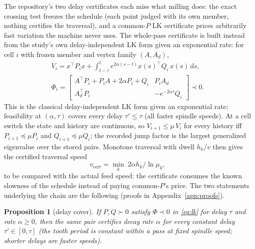 \documentclass[preprint,12pt]{elsarticle}
\newtheorem{proposition}{Proposition}
\newcommand{\vcert}{v_{\mathrm{cert}}}
\begin{document}
The repository's two delay certificates each miss what milling does:
the exact crossing test freezes the schedule (each point judged with
its own member, nothing certifies the traversal), and a common-$P$ LK
certificate prices arbitrarily fast variation the machine never uses.
The whole-pass certificate is built instead from the study's own
delay-independent LK form given an exponential rate: for cell $i$ with
frozen member and vertex family $(A, A_d)$,
\begin{equation}
\begin{gathered}
V_i = x^{\!\top} P_i x + \int_{t-\tau}^{t} e^{2\alpha(s-t)}
      x(s)^{\!\top} Q_i\, x(s)\, ds, \\
\Phi_i = \begin{bmatrix} A^{\!\top}P_i + P_iA + 2\alpha P_i + Q_i &
P_iA_d \\ A_d^{\!\top}P_i & -e^{-2\alpha\tau} Q_i \end{bmatrix}
\prec 0 .
\end{gathered}
\label{eq:lk}
\end{equation}
This is the classical delay-independent LK form \cite{Gu2003} given an
exponential rate; feasibility at $(\alpha, \tau)$ covers every delay
$\tau' \le \tau$ (all faster spindle speeds).  At a cell switch the
state and history are continuous, so $V_{i+1} \le \mu\, V_i$ for every
history iff $P_{i+1} \preceq \mu P_i$ and $Q_{i+1} \preceq \mu Q_i$;
the recorded jump factor is the largest generalized eigenvalue over
the stored pairs.  Monotone traversal with dwell $h_k / v$ then gives
the certified traversal speed
\begin{equation}
\vcert = \min_k \; 2\alpha h_k / \ln \mu_k ,
\label{eq:vcert}
\end{equation}
to be compared with the actual feed speed: the certificate consumes
the known slowness of the schedule instead of paying common-$P$'s
price.  The two statements underlying the chain are the following
(proofs in Appendix~\ref{app:proofs}).

\begin{proposition}[delay cover]\label{prop:cover}
If $P, Q \succ 0$ satisfy $\Phi \prec 0$ in \eqref{eq:lk} for delay
$\tau$ and rate $\alpha \ge 0$, then the same pair certifies decay
rate $\alpha$ for every \emph{constant} delay $\tau' \in [0, \tau]$
(the tooth period is constant within a pass at fixed spindle speed;
shorter delays are faster speeds).
\end{proposition}
\end{document}
